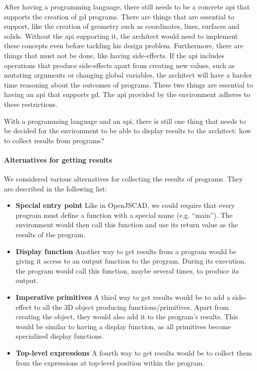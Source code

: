 After having a programming language, there still needs to be a concrete \gls{api} that supports the creation of \gls{gd} programs.
There are things that are essential to support, like the creation of geometry such as coordinates, lines, surfaces and solids.
Without the \gls{api} supporting it, the architect would need to implement these concepts even before tackling his design problem.
Furthermore, there are things that must not be done, like having side-effects.
If the \gls{api} includes operations that produce side-effects apart from creating new values, such as mutating arguments or changing global variables, the architect will have a harder time reasoning about the outcomes of programs.
These two things are essential to having an \gls{api} that supports \gls{gd}.
The \gls{api} provided by the environment adheres to these restrictions.

With a programming language and an \gls{api}, there is still one thing that needs to be decided for the environment to be able to display results to the architect:
how to collect results from programs?

\paragraph{Alternatives for getting results}
We considered various alternatives for collecting the results of programs.
They are described in the following list:
\begin{itemize}
  \item {\bf Special entry point} Like in OpenJSCAD, we could require that every program must define a function with a special name (e.g. ``main'').
  The environment would then call this function and use its return value as the results of the program.

  \item {\bf Display function} Another way to get results from a program would be giving it access to an output function to the program.
  During its execution, the program would call this function, maybe several times, to produce its output.

  \item {\bf Imperative primitives} A third way to get results would be to add a side-effect to all the 3D object producing functions/primitives.
  Apart from creating the object, they would also add it to the program's results.
  This would be similar to having a display function, as all primitives become specialized display functions.

  \item {\bf Top-level expressions} A fourth way to get results would be to collect them from the expressions at top-level position within the program.
\end{itemize}

